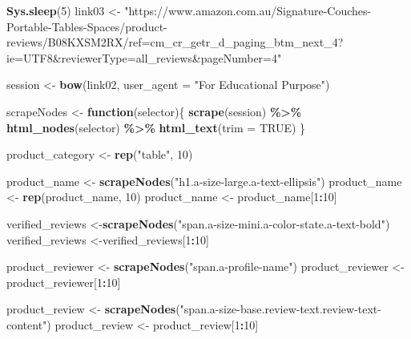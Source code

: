 \documentclass[
]{article}
\newenvironment{Shaded}{\begin{snugshade}}{\end{snugshade}}
\newcommand{\AttributeTok}[1]{\textcolor[rgb]{0.13,0.29,0.53}{#1}}
\newcommand{\ConstantTok}[1]{\textcolor[rgb]{0.56,0.35,0.01}{#1}}
\newcommand{\ControlFlowTok}[1]{\textcolor[rgb]{0.13,0.29,0.53}{\textbf{#1}}}
\newcommand{\DecValTok}[1]{\textcolor[rgb]{0.00,0.00,0.81}{#1}}
\newcommand{\FunctionTok}[1]{\textcolor[rgb]{0.13,0.29,0.53}{\textbf{#1}}}
\newcommand{\NormalTok}[1]{#1}
\newcommand{\OtherTok}[1]{\textcolor[rgb]{0.56,0.35,0.01}{#1}}
\newcommand{\SpecialCharTok}[1]{\textcolor[rgb]{0.81,0.36,0.00}{\textbf{#1}}}
\newcommand{\StringTok}[1]{\textcolor[rgb]{0.31,0.60,0.02}{#1}}
\begin{document}
\begin{Shaded}
\begin{Highlighting}[]
   \FunctionTok{Sys.sleep}\NormalTok{(}\DecValTok{5}\NormalTok{)}
\NormalTok{link03 }\OtherTok{\textless{}{-}} \StringTok{"https://www.amazon.com.au/Signature{-}Couches{-}Portable{-}Tables{-}Spaces/product{-}reviews/B08KXSM2RX/ref=cm\_cr\_getr\_d\_paging\_btm\_next\_4?ie=UTF8\&reviewerType=all\_reviews\&pageNumber=4"}


\NormalTok{  session }\OtherTok{\textless{}{-}} \FunctionTok{bow}\NormalTok{(link02,}
               \AttributeTok{user\_agent =} \StringTok{"For Educational Purpose"}\NormalTok{)}

\NormalTok{  scrapeNodes }\OtherTok{\textless{}{-}} \ControlFlowTok{function}\NormalTok{(selector)\{}
    \FunctionTok{scrape}\NormalTok{(session) }\SpecialCharTok{\%\textgreater{}\%}
      \FunctionTok{html\_nodes}\NormalTok{(selector) }\SpecialCharTok{\%\textgreater{}\%}
      \FunctionTok{html\_text}\NormalTok{(}\AttributeTok{trim =} \ConstantTok{TRUE}\NormalTok{)}
\NormalTok{  \}}

\NormalTok{  product\_category }\OtherTok{\textless{}{-}} \FunctionTok{rep}\NormalTok{(}\StringTok{"table"}\NormalTok{, }\DecValTok{10}\NormalTok{)}

\NormalTok{  product\_name }\OtherTok{\textless{}{-}} \FunctionTok{scrapeNodes}\NormalTok{(}\StringTok{"h1.a{-}size{-}large.a{-}text{-}ellipsis"}\NormalTok{)}
\NormalTok{  product\_name }\OtherTok{\textless{}{-}} \FunctionTok{rep}\NormalTok{(product\_name, }\DecValTok{10}\NormalTok{)}
\NormalTok{  product\_name }\OtherTok{\textless{}{-}}\NormalTok{ product\_name[}\DecValTok{1}\SpecialCharTok{:}\DecValTok{10}\NormalTok{]}
  
\NormalTok{  verified\_reviews }\OtherTok{\textless{}{-}}\FunctionTok{scrapeNodes}\NormalTok{(}\StringTok{"span.a{-}size{-}mini.a{-}color{-}state.a{-}text{-}bold"}\NormalTok{)}
\NormalTok{  verified\_reviews }\OtherTok{\textless{}{-}}\NormalTok{verified\_reviews[}\DecValTok{1}\SpecialCharTok{:}\DecValTok{10}\NormalTok{]}
  
\NormalTok{  product\_reviewer }\OtherTok{\textless{}{-}} \FunctionTok{scrapeNodes}\NormalTok{(}\StringTok{"span.a{-}profile{-}name"}\NormalTok{)}
\NormalTok{  product\_reviewer }\OtherTok{\textless{}{-}}\NormalTok{ product\_reviewer[}\DecValTok{1}\SpecialCharTok{:}\DecValTok{10}\NormalTok{]}
  
\NormalTok{  product\_review }\OtherTok{\textless{}{-}} \FunctionTok{scrapeNodes}\NormalTok{(}\StringTok{"span.a{-}size{-}base.review{-}text.review{-}text{-}content"}\NormalTok{)}
\NormalTok{  product\_review }\OtherTok{\textless{}{-}}\NormalTok{ product\_review[}\DecValTok{1}\SpecialCharTok{:}\DecValTok{10}\NormalTok{]}
  

\end{Highlighting}
\end{Shaded}
\end{document}
